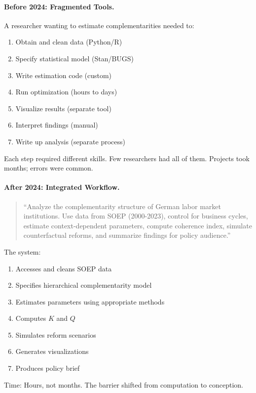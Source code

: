 \documentclass[12pt,a4paper]{article}
\begin{document}
\paragraph{Before 2024: Fragmented Tools.}
A researcher wanting to estimate complementarities needed to:
\begin{enumerate}
  \item Obtain and clean data (Python/R)
  \item Specify statistical model (Stan/BUGS)
  \item Write estimation code (custom)
  \item Run optimization (hours to days)
  \item Visualize results (separate tool)
  \item Interpret findings (manual)
  \item Write up analysis (separate process)
\end{enumerate}

Each step required different skills. Few researchers had all of them.
Projects took months; errors were common.

\paragraph{After 2024: Integrated Workflow.}
\begin{quote}
``Analyze the complementarity structure of German labor market institutions.
Use data from SOEP (2000-2023), control for business cycles,
estimate context-dependent parameters, compute coherence index,
simulate counterfactual reforms, and summarize findings for policy audience.''
\end{quote}

The system:
\begin{enumerate}
  \item Accesses and cleans SOEP data
  \item Specifies hierarchical complementarity model
  \item Estimates parameters using appropriate methods
  \item Computes $K$ and $Q$
  \item Simulates reform scenarios
  \item Generates visualizations
  \item Produces policy brief
\end{enumerate}

Time: Hours, not months. The barrier shifted from computation to conception.
\end{document}

